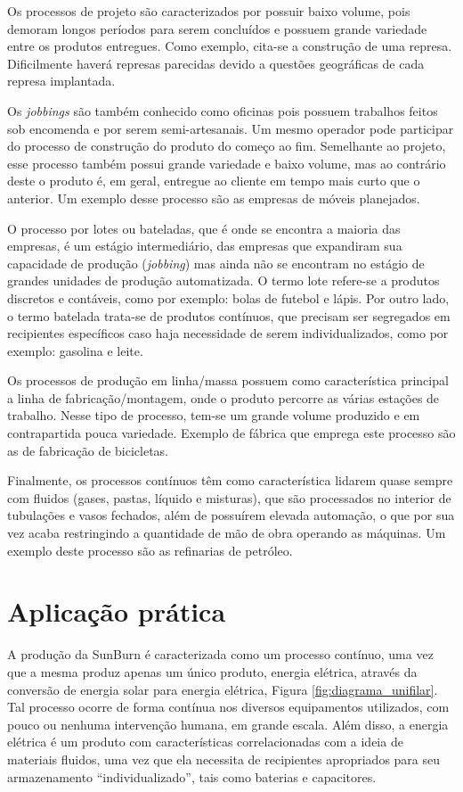 Os processos de projeto são caracterizados por possuir baixo volume, pois demoram longos períodos para serem concluídos e possuem grande variedade entre os produtos entregues. Como exemplo, cita-se a construção de uma represa. Dificilmente haverá represas parecidas devido a questões geográficas de cada represa implantada.

Os \textit{jobbings} são também conhecido como oficinas pois possuem trabalhos feitos sob encomenda e por serem semi-artesanais. Um mesmo operador pode participar do processo de construção do produto do começo ao fim. Semelhante ao projeto, esse processo também possui grande variedade e baixo volume, mas ao contrário deste o produto é, em geral, entregue ao cliente em tempo mais curto que o anterior. Um exemplo desse processo são as empresas de móveis planejados.

O processo por lotes ou bateladas, que é onde se encontra a maioria das empresas, é um estágio intermediário, das empresas que expandiram sua capacidade de produção (\textit{jobbing}) mas ainda não se encontram no estágio de grandes unidades de produção automatizada. O termo lote refere-se a produtos discretos e contáveis, como por exemplo: bolas de futebol e lápis. Por outro lado, o termo batelada trata-se de produtos contínuos, que precisam ser segregados em recipientes específicos caso haja necessidade de serem individualizados, como por exemplo: gasolina e leite.

Os processos de produção em linha/massa possuem como característica principal a linha de fabricação/montagem, onde o produto percorre as várias estações de trabalho. Nesse tipo de processo, tem-se um grande volume produzido e em contrapartida pouca variedade. Exemplo de fábrica que emprega este processo são as de fabricação de bicicletas.

Finalmente, os processos contínuos têm como característica lidarem quase sempre com fluidos (gases, pastas, líquido e misturas), que são processados no interior de tubulações e vasos fechados, além de possuírem elevada automação, o que por sua vez acaba restringindo a quantidade de mão de obra operando as máquinas. Um exemplo deste processo são as refinarias de petróleo.


\section{Aplicação prática}
\label{sec:tipos_de_processo_de_producao_aplicacao}

A produção da SunBurn é caracterizada como um processo contínuo, uma vez que a mesma produz apenas um único produto, energia elétrica, através da conversão de energia solar para energia elétrica, Figura \ref{fig:diagrama_unifilar}. Tal processo ocorre de forma contínua nos diversos equipamentos utilizados, com pouco ou nenhuma intervenção humana, em grande escala. Além disso, a energia elétrica é um produto com características correlacionadas com a ideia de materiais fluidos, uma vez que ela necessita de recipientes apropriados para seu armazenamento ``individualizado'', tais como baterias e capacitores.

